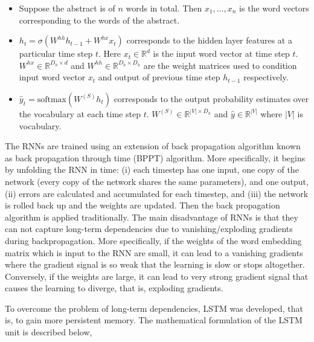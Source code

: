 \begin{itemize}
	\item Suppose the abstract is of $n$ words in total. Then $x_1, \ldots, x_n$ is the word vectors corresponding to the words of the abstract.

	\item $h_t = \sigma(W^{hh}h_{t-1} + W^{hx}x_t)$ corresponds to the hidden layer features at a particular time step $t$. Here $x_t \in \mathbb{R}^d$ is the input word vector at time step $t$. $W^{hx} \in \mathbb{R}^{D_h \times d}$ and $W^{hh} \in \mathbb{R}^{D_h \times D_h}$ are the weight matrices used to condition input word vector $x_t$ and output of previous time step $h_{t-1}$ respectively.

	\item $\widehat{y}_t = \text{softmax}(W^{(S)} h_t)$ corresponds to the output probability estimates over the vocabulary at each time step $t$. $W^{(S)} \in \mathbb{R}^{|V| \times D_h}$ and $\widehat{y} \in \mathbb{R}^{|V|}$ where $|V|$ is vocabulary.


\end{itemize}

The RNNs are trained using an extension of back propagation algorithm known as back propagation through time (BPPT) algorithm. More specifically, it begins by unfolding the RNN in time: (i) each timestep has one input, one copy of the network (every copy of the network shares the same parameters), and one output, (ii) errors are calculated and accumulated for each timestep, and (iii) the network is rolled back up and the weights are updated.  Then the back propagation algorithm is applied traditionally. The main disadvantage of RNNs is that they can not capture long-term dependencies due to vanishing/exploding gradients during backpropagation. More specifically, if the weights of the word embedding matrix which is input to the RNN are small, it can lead to a vanishing gradients where the gradient signal is so weak that the learning is slow or stops altogether. Conversely, if the weights are large, it can lead to very strong gradient signal that causes the learning to diverge, that is, exploding gradients.

To overcome the problem of long-term dependencies, LSTM was developed, that is, to gain more persistent memory. The mathematical formulation of the LSTM unit is described below,


